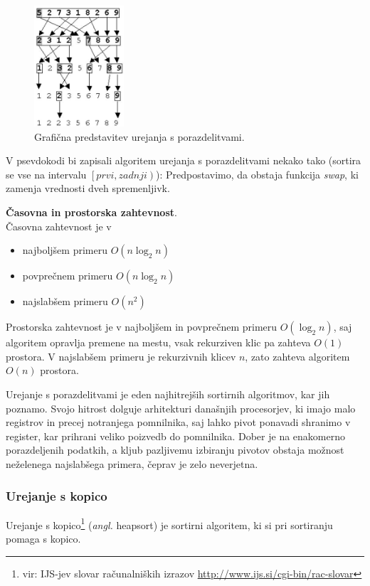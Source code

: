 \documentclass[a4paper,oneside]{article}
\begin{document}

\begin{figure}[h]
    \begin{center}
        \includegraphics[height=45mm]{slike/quicksort.jpg}
    \end{center}
    \caption{Grafična predstavitev urejanja s porazdelitvami.}
    \label{fig:quick-sort-predst}
\end{figure}

V psevdokodi bi zapisali algoritem urejanja s porazdelitvami
nekako tako (sortira se vse na intervalu
$\left[prvi, zadnji\right)$):
Predpostavimo, da obstaja funkcija \emph{swap}, ki zamenja vrednosti dveh spremenljivk.



\textbf{Časovna in prostorska zahtevnost}. \\
Časovna zahtevnost je v 
\begin{itemize}
  \item najboljšem primeru $O(n\log_2 n)$
  \item povprečnem primeru $O(n\log_2 n)$
  \item najslabšem primeru $O(n^2)$
\end{itemize}

Prostorska zahtevnost je v najboljšem in povprečnem primeru $O(\log_2 n)$, 
saj algoritem opravlja premene na mestu, vsak rekurziven klic pa zahteva $O(1)$ prostora.
V najslabšem primeru je rekurzivnih klicev $n$, zato zahteva algoritem $O(n)$ prostora.

Urejanje s porazdelitvami je eden najhitrejših sortirnih algoritmov, kar jih
poznamo. Svojo hitrost dolguje arhitekturi današnjih procesorjev, ki imajo
malo registrov in precej notranjega pomnilnika, saj lahko pivot ponavadi shranimo v
register, kar prihrani veliko poizvedb do pomnilnika. Dober je na enakomerno
porazdeljenih podatkih, a kljub pazljivemu izbiranju pivotov obstaja možnost neželenega
najslabšega primera, čeprav je zelo neverjetna. 

\subsubsection{Urejanje s kopico}
Urejanje s kopico\footnote{vir: IJS-jev slovar računalniških izrazov
\url{http://www.ijs.si/cgi-bin/rac-slovar}} (\emph{angl.} heapsort) je sortirni algoritem,
ki si pri sortiranju pomaga s kopico.
\newline
\end{document}
